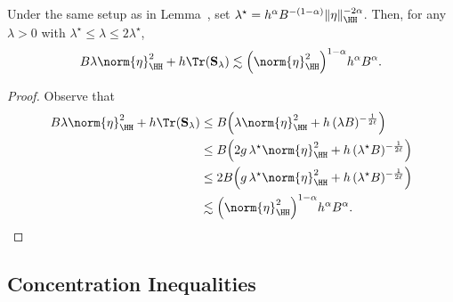 \documentclass[12pt,a4paper,pdftex,onepage]{article}
\newcommand{\Sbar}{\mathbf{S}}
\begin{document}
\begin{corollary}\label{corollary; optimal MSE in grid}
Under the same setup as in Lemma~, set \(\lambda^\star = h^{\alpha}B^{-(1-\alpha)}\|\eta\|_{\HH}^{-2\alpha}\). Then, for any \(\lambda > 0\) with \(\lambda^\star \leq \lambda \leq 2\lambda^\star\),
\begin{align*}
B \lambda \norm{\eta}^2_\HH + h \Tr(\Sbar_{\lambda}) \lesssim \Bigl(\norm{\eta}_\HH^2\Bigr)^{1-\alpha} h^{\alpha} B^{\alpha}.
\end{align*}
\end{corollary}

\begin{proof}
Observe that 
\begin{align*}
B \lambda \norm{\eta}^2_\HH + h \Tr(\Sbar_{\lambda})
&\leq B\Bigl( \lambda \norm{\eta}^2_\HH + h\, (\lambda B)^{-\frac{1}{2\ell}}\Bigr) \\
&\leq B\Bigl(2g\, \lambda^\star \norm{\eta}^2_\HH + h\, (\lambda^\star B)^{-\frac{1}{2\ell}}\Bigr) \\
&\leq 2B\Bigl(g\, \lambda^\star \norm{\eta}^2_\HH + h\, (\lambda^\star B)^{-\frac{1}{2\ell}}\Bigr) \\
&\lesssim \Bigl(\norm{\eta}_\HH^2\Bigr)^{1-\alpha} h^{\alpha} B^{\alpha}.
\end{align*}
\end{proof}


\subsection{Concentration Inequalities}
\end{document}
